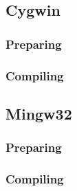 \subsection{Cygwin}
\label{compiling_unisim_for_cygwin}

\subsubsection{Preparing}

\subsubsection{Compiling}

\subsection{Mingw32}
\label{compiling_unisim_for_mingw32}

\subsubsection{Preparing}

\subsubsection{Compiling}
